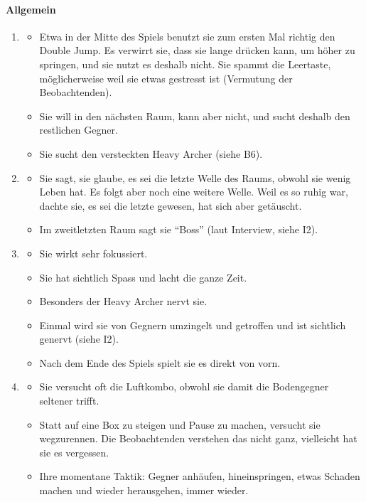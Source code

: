 \documentclass[../Main.tex]{subfiles}
\begin{document}
\paragraph{Allgemein}
\begin{enumerate}[label=\textbf{B\arabic*}, leftmargin=1.5cm, itemsep=0.8em, resume]
\item
    \begin{itemize}[nosep]
        \item Etwa in der Mitte des Spiels benutzt sie zum ersten Mal richtig den Double Jump. Es verwirrt sie, dass sie lange drücken kann, um höher zu springen, und sie nutzt es deshalb nicht. Sie spammt die Leertaste, möglicherweise weil sie etwas gestresst ist (Vermutung der Beobachtenden).
        \item Sie will in den nächsten Raum, kann aber nicht, und sucht deshalb den restlichen Gegner.
        \item Sie sucht den versteckten Heavy Archer (siehe B6).
    \end{itemize}

\item
    \begin{itemize}[nosep]
        \item Sie sagt, sie glaube, es sei die letzte Welle des Raums, obwohl sie wenig Leben hat. Es folgt aber noch eine weitere Welle. Weil es so ruhig war, dachte sie, es sei die letzte gewesen, hat sich aber getäuscht.
        \item Im zweitletzten Raum sagt sie \enquote{Boss} (laut Interview, siehe I2).
    \end{itemize}

\item
    \begin{itemize}[nosep]
        \item Sie wirkt sehr fokussiert.
        \item Sie hat sichtlich Spass und lacht die ganze Zeit.
        \item Besonders der Heavy Archer nervt sie.
        \item Einmal wird sie von Gegnern umzingelt und getroffen und ist sichtlich genervt (siehe I2).
        \item Nach dem Ende des Spiels spielt sie es direkt von vorn.
    \end{itemize}

\item
    \begin{itemize}[nosep]
        \item Sie versucht oft die Luftkombo, obwohl sie damit die Bodengegner seltener trifft.
        \item Statt auf eine Box zu steigen und Pause zu machen, versucht sie wegzurennen. Die Beobachtenden verstehen das nicht ganz, vielleicht hat sie es vergessen.
        \item Ihre momentane Taktik: Gegner anhäufen, hineinspringen, etwas Schaden machen und wieder herausgehen, immer wieder.
    \end{itemize}


\end{enumerate}
\end{document}
